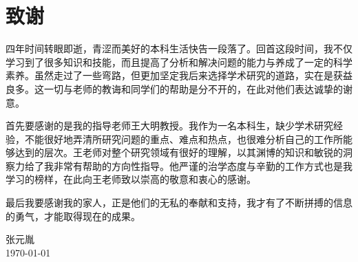 
\chapter{致谢}

	四年时间转眼即逝，青涩而美好的本科生活快告一段落了。回首这段时间，我不仅学习到了很多知识和技能，而且提高了分析和解决问题的能力与养成了一定的科学素养。虽然走过了一些弯路，但更加坚定我后来选择学术研究的道路，实在是获益良多。这一切与老师的教诲和同学们的帮助是分不开的，在此对他们表达诚挚的谢意。

	首先要感谢的是我的指导老师王大明教授。我作为一名本科生，缺少学术研究经验，不能很好地弄清所研究问题的重点、难点和热点，也很难分析自己的工作所能够达到的层次。王老师对整个研究领域有很好的理解，以其渊博的知识和敏锐的洞察力给了我非常有帮助的方向性指导。他严谨的治学态度与辛勤的工作方式也是我学习的榜样，在此向王老师致以崇高的敬意和衷心的感谢。

	最后我要感谢我的家人，正是他们的无私的奉献和支持，我才有了不断拼搏的信息的勇气，才能取得现在的成果。

\vskip 108pt
\begin{flushright}
	张元胤\makebox[1cm]{} \\
\today
\end{flushright}

